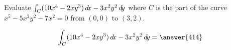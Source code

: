 \documentclass{ximera}
\author{David Guichard \and Neal Koblitz \and H. Jerome Keisler \and Albert Scheller \and Barry Balof \and Mike Wills \and Matthew Carr}
\begin{document}
\begin{exercise}




Evaluate $\int_{C}(10x^4-2xy^3)\mathop{}\!d\! x-3x^2y^2\mathop{}\!d\! y$ where $C$ is the part of the curve $x^5-5x^2y^2-7x^2=0$ from $(0,0)$ to $(3,2)$.

\begin{prompt}
\[
\int_{C}(10x^4-2xy^3)\d x-3x^2y^2\d y=\answer{414}
\]
\end{prompt}

\end{exercise}
\end{document}
